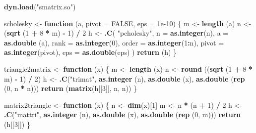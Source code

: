 \documentclass[12pt,]{article}
\newenvironment{Shaded}{\begin{snugshade}}{\end{snugshade}}
\newcommand{\ControlFlowTok}[1]{\textcolor[rgb]{0.13,0.29,0.53}{\textbf{#1}}}
\newcommand{\DataTypeTok}[1]{\textcolor[rgb]{0.13,0.29,0.53}{#1}}
\newcommand{\DecValTok}[1]{\textcolor[rgb]{0.00,0.00,0.81}{#1}}
\newcommand{\FloatTok}[1]{\textcolor[rgb]{0.00,0.00,0.81}{#1}}
\newcommand{\KeywordTok}[1]{\textcolor[rgb]{0.13,0.29,0.53}{\textbf{#1}}}
\newcommand{\NormalTok}[1]{#1}
\newcommand{\OperatorTok}[1]{\textcolor[rgb]{0.81,0.36,0.00}{\textbf{#1}}}
\newcommand{\OtherTok}[1]{\textcolor[rgb]{0.56,0.35,0.01}{#1}}
\newcommand{\StringTok}[1]{\textcolor[rgb]{0.31,0.60,0.02}{#1}}
\begin{document}
\begin{Shaded}
\begin{Highlighting}[]
\KeywordTok{dyn.load}\NormalTok{(}\StringTok{"smatrix.so"}\NormalTok{)}

\NormalTok{scholesky <-}\StringTok{ }\ControlFlowTok{function}\NormalTok{ (a, }\DataTypeTok{pivot =} \OtherTok{FALSE}\NormalTok{, }\DataTypeTok{eps =} \FloatTok{1e-10}\NormalTok{) \{}
\NormalTok{  m <-}\StringTok{ }\KeywordTok{length}\NormalTok{ (a)}
\NormalTok{  n <-}\StringTok{ }\NormalTok{(}\KeywordTok{sqrt}\NormalTok{ (}\DecValTok{1} \OperatorTok{+}\StringTok{ }\DecValTok{8} \OperatorTok{*}\StringTok{ }\NormalTok{m) }\OperatorTok{-}\StringTok{ }\DecValTok{1}\NormalTok{) }\OperatorTok{/}\StringTok{ }\DecValTok{2}
\NormalTok{  h <-}\StringTok{ }\KeywordTok{.C}\NormalTok{(}
    \StringTok{"pcholesky"}\NormalTok{,}
    \DataTypeTok{n =} \KeywordTok{as.integer}\NormalTok{(n),}
    \DataTypeTok{a =} \KeywordTok{as.double}\NormalTok{ (a),}
    \DataTypeTok{rank =} \KeywordTok{as.integer}\NormalTok{(}\DecValTok{0}\NormalTok{),}
    \DataTypeTok{order =} \KeywordTok{as.integer}\NormalTok{(}\DecValTok{1}\OperatorTok{:}\NormalTok{n),}
    \DataTypeTok{pivot =} \KeywordTok{as.integer}\NormalTok{(pivot),}
    \DataTypeTok{eps =} \KeywordTok{as.double}\NormalTok{(eps)}
\NormalTok{  )}
  \KeywordTok{return}\NormalTok{ (h)}
\NormalTok{\}}

\NormalTok{triangle2matrix <-}\StringTok{ }\ControlFlowTok{function}\NormalTok{ (x) \{}
\NormalTok{  m <-}\StringTok{ }\KeywordTok{length}\NormalTok{ (x)}
\NormalTok{  n <-}\StringTok{ }\KeywordTok{round}\NormalTok{ ((}\KeywordTok{sqrt}\NormalTok{ (}\DecValTok{1} \OperatorTok{+}\StringTok{ }\DecValTok{8} \OperatorTok{*}\StringTok{ }\NormalTok{m) }\OperatorTok{-}\StringTok{ }\DecValTok{1}\NormalTok{) }\OperatorTok{/}\StringTok{ }\DecValTok{2}\NormalTok{)}
\NormalTok{  h <-}
\StringTok{    }\KeywordTok{.C}\NormalTok{(}\StringTok{"trimat"}\NormalTok{, }\KeywordTok{as.integer}\NormalTok{ (n), }\KeywordTok{as.double}\NormalTok{ (x), }\KeywordTok{as.double}\NormalTok{ (}\KeywordTok{rep}\NormalTok{ (}\DecValTok{0}\NormalTok{, n }\OperatorTok{*}\StringTok{ }\NormalTok{n)))}
  \KeywordTok{return}\NormalTok{ (}\KeywordTok{matrix}\NormalTok{(h[[}\DecValTok{3}\NormalTok{]], n, n))}
\NormalTok{\}}

\NormalTok{matrix2triangle <-}\StringTok{ }\ControlFlowTok{function}\NormalTok{ (x) \{}
\NormalTok{  n <-}\StringTok{ }\KeywordTok{dim}\NormalTok{(x)[}\DecValTok{1}\NormalTok{]}
\NormalTok{  m <-}\StringTok{ }\NormalTok{n }\OperatorTok{*}\StringTok{ }\NormalTok{(n }\OperatorTok{+}\StringTok{ }\DecValTok{1}\NormalTok{) }\OperatorTok{/}\StringTok{ }\DecValTok{2}
\NormalTok{  h <-}
\StringTok{    }\KeywordTok{.C}\NormalTok{(}\StringTok{"mattri"}\NormalTok{, }\KeywordTok{as.integer}\NormalTok{ (n), }\KeywordTok{as.double}\NormalTok{ (x), }\KeywordTok{as.double}\NormalTok{ (}\KeywordTok{rep}\NormalTok{ (}\DecValTok{0}\NormalTok{, m)))}
  \KeywordTok{return}\NormalTok{ (h[[}\DecValTok{3}\NormalTok{]])}
\NormalTok{\}}


\end{Highlighting}
\end{Shaded}
\end{document}
